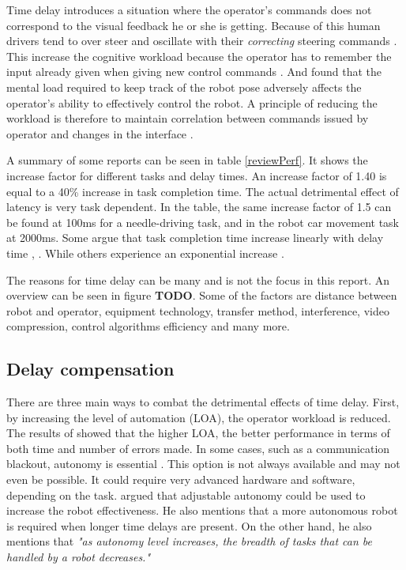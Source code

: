 Time delay introduces a situation where the operator's commands does not correspond to the visual feedback he or she is getting. Because of this human drivers tend to over steer and oscillate with their \emph{correcting} steering commands \citep{Appelqvist2007}. This increase the cognitive workload because the operator has to remember the input already given when giving new control commands \citep{Matheson2013}. And \citep{Ricks2004} found that the mental load required to keep track of the robot pose adversely affects the operator's ability to effectively control the robot. A principle of reducing the workload is therefore to maintain correlation between commands issued by operator and changes in the interface \citep{Nielsen2007}. 

A summary of some reports can be seen in table \ref{reviewPerf}. It shows the increase factor for different tasks and delay times. An increase factor of 1.40 is equal to a 40\% increase in task completion time. The actual detrimental effect of latency is very task dependent. In the table, the same increase factor of 1.5 can be found at 100ms for a needle-driving task, and in the robot car movement task at 2000ms.
Some argue that task completion time increase linearly with delay time \citep{Ando1999}, \citep{Lane2002}. While others experience an exponential increase \citep{Xu2014}.



The reasons for time delay can be many and is not the focus in this report. An overview can be seen in figure \textbf{TODO}. Some of the factors are distance between robot and operator, equipment technology, transfer method, interference, video compression, control algorithms efficiency and many more.



\subsection{Delay compensation}

There are three main ways to combat the detrimental effects of time delay. First, by increasing the level of automation (LOA), the operator workload is reduced. The results of \citep{Luck2006} showed that the higher LOA, the better performance in terms of both time and number of errors made. In some cases, such as a communication blackout, autonomy is essential \citep{Dorais1999}. This option is not always available and may not even be possible. It could require very advanced hardware and software, depending on the task. \citep{Goodrich2001} argued that adjustable autonomy could be used to increase the robot effectiveness. He also mentions that a more autonomous robot is required when longer time delays are present. On the other hand, he also mentions that \emph{"as autonomy level increases, the breadth of tasks that can be handled by a robot decreases."}

